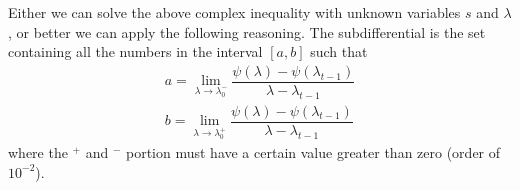 \documentclass[notitlepage]{article}
\begin{document}
Either we can solve the above complex inequality with unknown variables $s$ and $\lambda$, or better we can apply the following reasoning. The subdifferential is the set containing all the numbers in the 
interval $\left[a,b\right]$ such that
\begin{align*}
  a = \lim_{\lambda \rightarrow \lambda_0^-} \dfrac{\psi(\lambda) - \psi(\lambda_{t-1})}{\lambda - \lambda_{t-1}} \\
  b = \lim_{\lambda \rightarrow \lambda_0^+} \dfrac{\psi(\lambda) - \psi(\lambda_{t-1})}{\lambda - \lambda_{t-1}}
\end{align*}
where the $^+$ and $^-$ portion must have a certain value greater than zero (order of $10^{-2}$).
\end{document}
